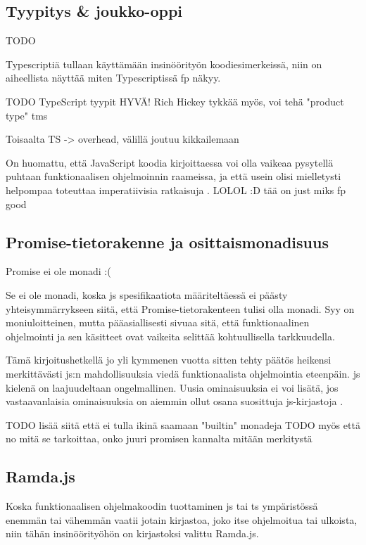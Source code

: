 \subsection{Tyypitys \& joukko-oppi}

TODO

Typescriptiä tullaan käyttämään insinöörityön koodiesimerkeissä, niin on aiheellista näyttää miten Typescriptissä fp näkyy.

TODO TypeScript tyypit HYVÄ! Rich Hickey tykkää myös, voi tehä "product type" tms

Toisaalta TS -> overhead, välillä joutuu kikkailemaan

On huomattu, että JavaScript koodia kirjoittaessa voi olla vaikeaa pysytellä puhtaan funktionaalisen ohjelmoinnin raameissa, ja että usein olisi mielletysti helpompaa toteuttaa imperatiivisia ratkaisuja \cite[44]{cantarella_fp_haitat}.  LOLOL :D tää on just miks fp good

\subsection{Promise-tietorakenne ja osittaismonadisuus}

Promise ei ole monadi :( \cite{read-it-later-11481,promises-spec-94}

Se ei ole monadi, koska \gls{js} spesifikaatiota määriteltäessä ei päästy yhteisymmärrykseen siitä, että Promise-tietorakenteen tulisi olla monadi. Syy on moniuloitteinen, mutta pääasiallisesti sivuaa sitä, että funktionaalinen ohjelmointi ja sen käsitteet ovat vaikeita selittää kohtuullisella tarkkuudella. \citep{promises-spec-94}

Tämä kirjoitushetkellä jo yli kymmenen vuotta sitten tehty päätös heikensi merkittävästi \gls{js}:n mahdollisuuksia viedä funktionaalista ohjelmointia eteenpäin. \Gls{js} kielenä on laajuudeltaan ongelmallinen. Uusia ominaisuuksia ei voi lisätä, jos vastaavanlaisia ominaisuuksia on aiemmin ollut osana suosittuja \gls{js}-kirjastoja \cite{proposal-joint-iteration,prototype_library_trends}.

TODO lisää siitä että ei tulla ikinä saamaan "builtin" monadeja
TODO myös että no mitä se tarkoittaa, onko juuri promisen kannalta mitään merkitystä

\subsection{Ramda.js}

Koska funktionaalisen ohjelmakoodin tuottaminen \gls{js} tai \gls{ts} ympäristössä enemmän tai vähemmän vaatii jotain kirjastoa, joko itse ohjelmoitua tai ulkoista, niin tähän insinöörityöhön on kirjastoksi valittu Ramda.js.

